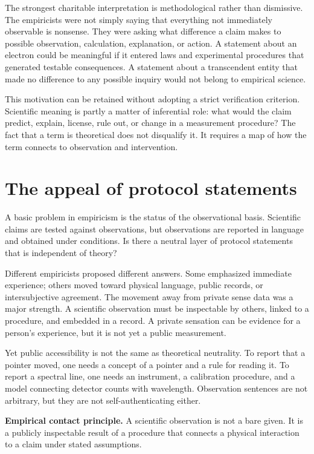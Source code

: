 The strongest charitable interpretation is methodological rather than
dismissive. The empiricists were not simply saying that everything not
immediately observable is nonsense. They were asking what difference a claim
makes to possible observation, calculation, explanation, or action. A statement
about an electron could be meaningful if it entered laws and experimental
procedures that generated testable consequences. A statement about a
transcendent entity that made no difference to any possible inquiry would not
belong to empirical science.

This motivation can be retained without adopting a strict verification
criterion. Scientific meaning is partly a matter of inferential role: what
would the claim predict, explain, license, rule out, or change in a measurement
procedure? The fact that a term is theoretical does not disqualify it. It
requires a map of how the term connects to observation and intervention.

\section{The appeal of protocol statements}

A basic problem in empiricism is the status of the observational basis.
Scientific claims are tested against observations, but observations are
reported in language and obtained under conditions. Is there a neutral layer of
protocol statements that is independent of theory?

Different empiricists proposed different answers. Some emphasized immediate
experience; others moved toward physical language, public records, or
intersubjective agreement. The movement away from private sense data was a
major strength. A scientific observation must be inspectable by others, linked
to a procedure, and embedded in a record. A private sensation can be evidence
for a person's experience, but it is not yet a public measurement.

Yet public accessibility is not the same as theoretical neutrality. To report
that a pointer moved, one needs a concept of a pointer and a rule for reading
it. To report a spectral line, one needs an instrument, a calibration procedure,
and a model connecting detector counts with wavelength. Observation sentences
are not arbitrary, but they are not self-authenticating either.

\begin{principlebox}
\textbf{Empirical contact principle.} A scientific observation is not a bare
given. It is a publicly inspectable result of a procedure that connects a
physical interaction to a claim under stated assumptions.
\end{principlebox}

